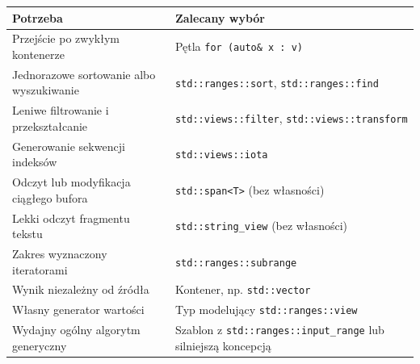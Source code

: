 \begin{center}
\small
\begin{tabular}{|p{6.0cm}|p{6.5cm}|}
\hline
\textbf{Potrzeba} & \textbf{Zalecany wybór} \\
\hline
Przejście po zwykłym kontenerze & Pętla \texttt{for (auto\& x : v)} \\
\hline
Jednorazowe sortowanie albo wyszukiwanie & \texttt{std::ranges::sort}, \texttt{std::ranges::find} \\
\hline
Leniwe filtrowanie i przekształcanie & \texttt{std::views::filter}, \texttt{std::views::transform} \\
\hline
Generowanie sekwencji indeksów & \texttt{std::views::iota} \\
\hline
Odczyt lub modyfikacja ciągłego bufora & \texttt{std::span<T>} (bez własności) \\
\hline
Lekki odczyt fragmentu tekstu & \texttt{std::string\_view} (bez własności) \\
\hline
Zakres wyznaczony iteratorami & \texttt{std::ranges::subrange} \\
\hline
Wynik niezależny od źródła & Kontener, np. \texttt{std::vector} \\
\hline
Własny generator wartości & Typ modelujący \texttt{std::ranges::view} \\
\hline
Wydajny ogólny algorytm generyczny & Szablon z \texttt{std::ranges::input\_range} lub silniejszą koncepcją \\
\hline
\end{tabular}
\end{center}

